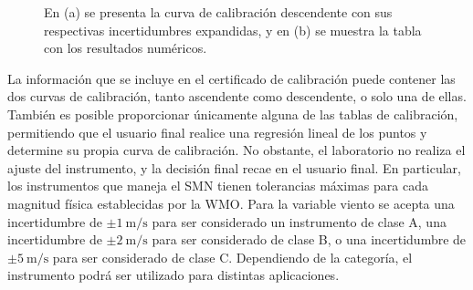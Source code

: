 \begin{figure}[H]
    \centering
    \begin{minipage}[b]{1\textwidth}
        \centering
    \end{minipage}  
    \hspace{2em} %
    \begin{minipage}[b]{0.7\textwidth}
        \centering
    \end{minipage}  
    \caption{En (a) se presenta la curva de calibración descendente con sus respectivas incertidumbres expandidas, y en (b) se muestra la tabla con los resultados numéricos.}
    \label{fig:deltaResultCalibDes}
\end{figure} 

La información que se incluye en el certificado de calibración puede contener las dos curvas de calibración, tanto ascendente como descendente, o solo una de ellas. También es posible proporcionar únicamente alguna de las tablas de calibración, permitiendo que el usuario final realice una regresión lineal de los puntos y determine su propia curva de calibración. No obstante, el laboratorio no realiza el ajuste del instrumento, y la decisión final recae en el usuario final. En particular, los instrumentos que maneja el SMN tienen tolerancias máximas para cada magnitud física \cite{wmo2020} establecidas por la WMO. Para la variable viento se acepta una incertidumbre de $\pm \SI{1}{\meter\per\second}$ para ser considerado un instrumento de clase A, una incertidumbre de $\pm \SI{2}{\meter\per\second}$ para ser considerado de clase B, o una incertidumbre de $\pm \SI{5}{\meter\per\second}$ para ser considerado de clase C. Dependiendo de la categoría, el instrumento podrá ser utilizado para distintas aplicaciones.


